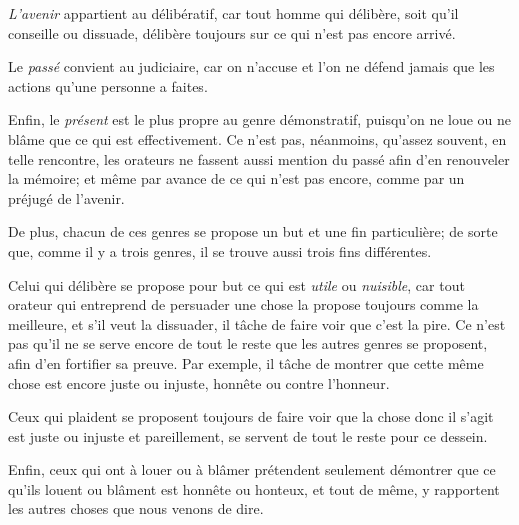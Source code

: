 \emph{L'avenir} appartient au délibératif, car tout homme qui délibère, soit qu'il conseille ou dissuade, délibère toujours
sur ce qui n'est pas encore arrivé. 

Le \emph{passé} convient au judiciaire, car on n'accuse et l'on ne défend jamais que les actions qu'une personne a faites. 

Enfin, le \emph{présent} est le plus propre au genre démonstratif, puisqu'on ne loue ou ne blâme que ce qui est effectivement.
Ce n'est pas, néanmoins, qu'assez souvent, en telle rencontre, les orateurs ne fassent aussi mention du passé afin d'en
renouveler la mémoire; et même par avance de ce qui n'est pas encore, comme par un préjugé de l'avenir. 

\bigbreak

De plus, chacun de ces genres se propose un but et une fin particulière; de sorte que, comme il y a trois genres, il se
trouve aussi trois fins différentes.

Celui qui délibère se propose pour but ce qui est \emph{utile} ou \emph{nuisible}, car tout orateur qui entreprend de
persuader une chose la propose toujours comme la meilleure, et s'il veut la dissuader, il tâche de faire voir que c'est
la pire. Ce n'est pas qu'il ne se serve encore de tout le reste que les autres genres se proposent, afin d'en fortifier
sa preuve. Par exemple, il tâche de montrer que cette même chose est encore juste ou injuste, honnête ou contre l'honneur. 

Ceux qui plaident se proposent toujours de faire voir que la chose donc il s'agit est juste ou injuste et pareillement,
se servent de tout le reste pour ce dessein.

Enfin, ceux qui ont à louer ou à blâmer prétendent seulement démontrer que ce qu'ils louent ou blâment est honnête ou
honteux, et tout de même, y rapportent les autres choses que nous venons de dire.

